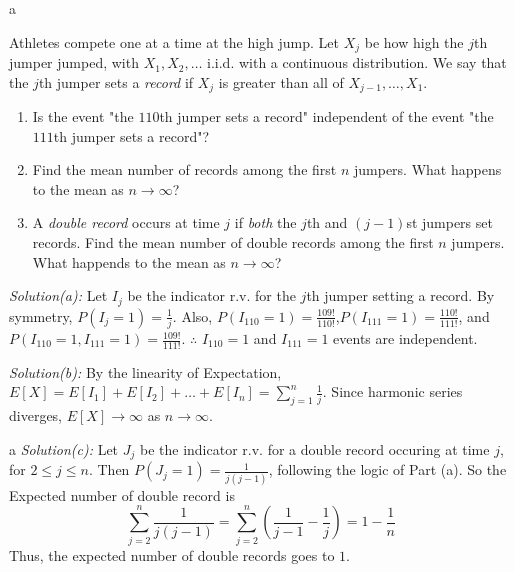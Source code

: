 \documentclass[8pt]{beamer}
\newcommand{\ti}[1]{\textit{#1}}
\begin{document}
\begin{frame}{a}
    \begin{example}[Records]
        Athletes compete one at a time at the high jump. Let $X_j$ be how high the $j$th jumper jumped, with $X_1, X_2, \dots$ i.i.d. with a continuous distribution. We say that the $j$th jumper sets a \ti{record} if $X_j$ is greater than all of $X_{j-1}, \dots, X_1$.

        \begin{enumerate}
            \item Is the event "the $110$th jumper sets a record" independent of the event "the $111$th jumper sets a record"?
            \item Find the mean number of records among the first $n$ jumpers. What happens to the mean as $n \rightarrow \infty$?
            \item A \ti{double record} occurs at time $j$ if \ti{both} the $j$th and $(j-1)$st jumpers set records. Find the mean number of double records among the first $n$ jumpers. What happends to the mean as $n \rightarrow \infty$?
        \end{enumerate}
        
        \ti{Solution(a):}
        Let $I_j$ be the indicator r.v. for the $j$th jumper setting a record. By symmetry, $P(I_j=1) = \frac{1}{j}$. Also, $P(I_{110}=1) = \frac{109!}{110!}$,$P(I_{111}=1) = \frac{110!}{111!}$, and $P(I_{110}=1, I_{111}=1) = \frac{109!}{111!}$. $\therefore$ $I_{110}=1$ and $I_{111}=1$ events are independent.

        \ti{Solution(b):}
        By the linearity of Expectation, $E[X] = E[I_1] + E[I_2] + \dots + E[I_n] = \sum_{j=1}^n \frac{1}{j}$. Since harmonic series diverges, $E[X] \rightarrow \infty$ as $n \rightarrow \infty$.
    \end{example}
\end{frame}

\begin{frame}{a}
    \ti{Solution(c):} Let $J_j$ be the indicator r.v. for a double record occuring at time $j$, for $2\leq j \leq n$. Then $P(J_j = 1) = \frac{1}{j(j-1)}$, following the logic of Part (a). So the Expected number of double record is 
    \[
    \sum_{j=2}^n \frac{1}{j(j-1)} = \sum_{j=2}^n \left( \frac{1}{j-1} - \frac{1}{j} \right) = 1- \frac{1}{n}
    \]
    Thus, the expected number of double records goes to $1$.

\end{frame}
\end{document}
